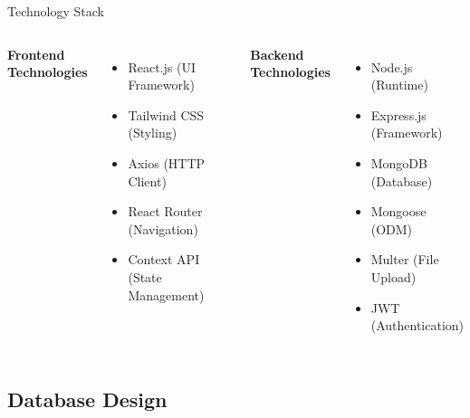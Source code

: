 \begin{frame}{Technology Stack}
\begin{columns}
\textbf{Frontend Technologies}
\begin{itemize}
    \item React.js (UI Framework)
    \item Tailwind CSS (Styling)
    \item Axios (HTTP Client)
    \item React Router (Navigation)
    \item Context API (State Management)
\end{itemize}

\textbf{Backend Technologies}
\begin{itemize}
    \item Node.js (Runtime)
    \item Express.js (Framework)
    \item MongoDB (Database)
    \item Mongoose (ODM)
    \item Multer (File Upload)
    \item JWT (Authentication)
\end{itemize}
\end{columns}
\end{frame}

\subsection{Database Design}

